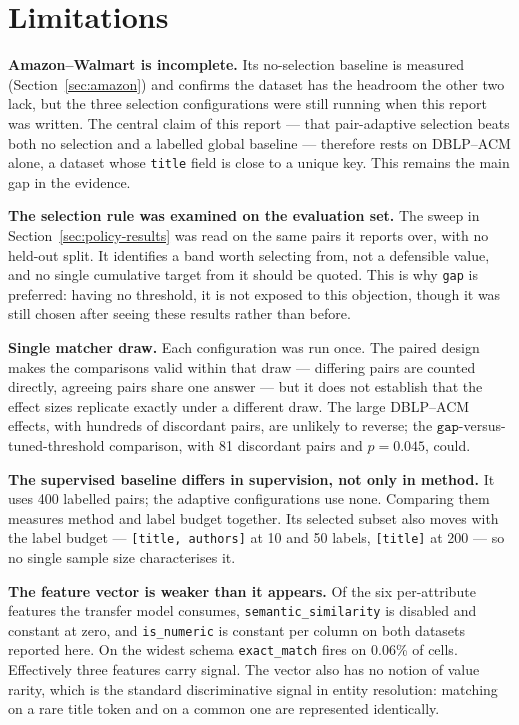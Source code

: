 \documentclass[11pt]{article}
\begin{document}
\section{Limitations}

\textbf{Amazon--Walmart is incomplete.} Its no-selection baseline is measured
(Section~\ref{sec:amazon}) and confirms the dataset has the headroom the other two lack,
but the three selection configurations were still running when this report was written. The
central claim of this report --- that pair-adaptive selection beats both no selection and a
labelled global baseline --- therefore rests on DBLP--ACM alone, a dataset whose
\texttt{title} field is close to a unique key. This remains the main gap in the evidence.

\textbf{The selection rule was examined on the evaluation set.} The sweep in
Section~\ref{sec:policy-results} was read on the same pairs it reports over, with no held-out
split. It identifies a band worth selecting from, not a defensible value, and no single
cumulative target from it should be quoted. This is why \texttt{gap} is preferred: having no
threshold, it is not exposed to this objection, though it was still chosen after seeing these
results rather than before.

\textbf{Single matcher draw.} Each configuration was run once. The paired design makes the
comparisons valid within that draw --- differing pairs are counted directly, agreeing pairs
share one answer --- but it does not establish that the effect sizes replicate exactly under
a different draw. The large DBLP--ACM effects, with hundreds of discordant pairs, are
unlikely to reverse; the $\texttt{gap}$-versus-tuned-threshold comparison, with 81 discordant
pairs and $p = 0.045$, could.

\textbf{The supervised baseline differs in supervision, not only in method.} It uses 400
labelled pairs; the adaptive configurations use none. Comparing them measures method and
label budget together. Its selected subset also moves with the label budget --- 
\texttt{[title, authors]} at 10 and 50 labels, \texttt{[title]} at 200 --- so no single
sample size characterises it.

\textbf{The feature vector is weaker than it appears.} Of the six per-attribute features the
transfer model consumes, \texttt{semantic\_similarity} is disabled and constant at zero, and
\texttt{is\_numeric} is constant per column on both datasets reported here. On the widest
schema \texttt{exact\_match} fires on 0.06\% of cells. Effectively three features carry
signal. The vector also has no notion of value rarity, which is the standard discriminative
signal in entity resolution: matching on a rare title token and on a common one are
represented identically.
\end{document}
